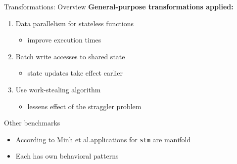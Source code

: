 \documentclass[aspectratio=169, usenames, dvipsnames]{beamer}
\begin{document}
\begin{frame}{Transformations: Overview}
  \textbf{General-purpose transformations applied:}\\

  \begin{enumerate}
    \item<2-> Data parallelism for stateless functions
    \begin{itemize}
      \item<2-> improve execution times\\[1.1\baselineskip]
    \end{itemize}
    \item<3-> Batch write accesses to shared state
    \begin{itemize}
      \item<3-> state updates take effect earlier\\[1.1\baselineskip]
    \end{itemize}
    \item<4-> Use work-stealing algorithm
    \begin{itemize}
      \item<4-> lessens effect of the straggler problem
    \end{itemize}
  \end{enumerate}
\end{frame}

\begin{frame}{Other benchmarks}
  \begin{itemize}
    \item According to Minh et al.\footnotemark[2] applications for \alert{\texttt{stm}} are manifold
    \item<2-> Each has own behavioral patterns\\
  \end{itemize}
\end{frame}
\end{document}
